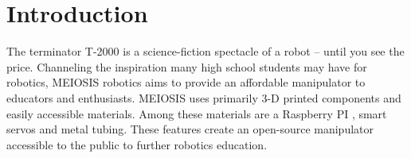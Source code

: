 \documentclass[12pt]{report}
\begin{document}
\normalem

{\tableofcontents\let\clearpage\relax\listoffigures\let\clearpage\relax\listoftables}
\clearpage
\newpage



\onehalfspacing
\section{Introduction}
The terminator T-2000 is a science-fiction spectacle of a robot -- until you see the price. Channeling the inspiration many high school students may have for robotics, MEIOSIS robotics aims to provide an affordable manipulator to educators and enthusiasts. MEIOSIS uses primarily 3-D printed components and easily accessible materials. Among these materials are a Raspberry PI , smart servos and metal tubing. These features create an open-source manipulator accessible to the public to further robotics education.
\vspace{-.5\baselineskip}
\end{document}
